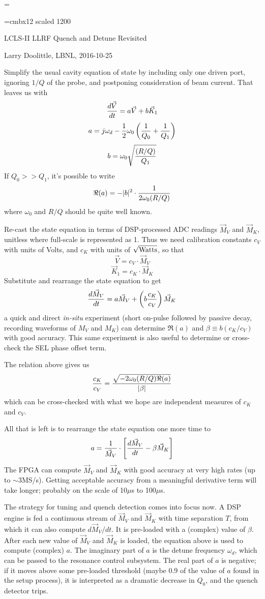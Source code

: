 
\magnification=

\parindent=0pt
\parskip=6pt
\baselineskip=14.0pt
\font\big=cmbx12 scaled 1200

\centerline{\big LCLS-II LLRF Quench and Detune Revisited}
\smallskip
\centerline{Larry Doolittle, LBNL, 2016-10-25}
\bigskip
Simplify the usual cavity equation of state by including only
one driven port, ignoring $1/Q$ of the probe, and postponing consideration
of beam current.
That leaves us with
$$ {d\vec V\over dt} = a \vec V + b \vec K_1 $$
$$ a = j\omega_d - {1\over 2}\omega_0\left({1\over Q_0}+{1\over Q_1}\right) $$
$$ b = \omega_0\sqrt{(R/Q)\over Q_1} $$
If $Q_0 >> Q_1$, it's possible to write
$$ \Re(a) = -|b|^2 \cdot {1\over 2\omega_0 (R/Q)} $$
where $\omega_0$ and $R/Q$ should be quite well known.

Re-cast the state equation in terms of DSP-processed ADC readings
$\vec M_V$ and $\vec M_K$, unitless where full-scale is represented as 1.
Thus we need calibration constants $c_V$ with units of Volts, and
$c_K$ with units of $\sqrt{\rm Watts}$, so that
$$ \vec V = c_V \cdot \vec M_V $$
$$ \vec K_1 = c_K \cdot \vec M_K $$
Substitute and rearrange the state equation to get
$$ {d\vec M_V\over dt} = a \vec M_V + \left(b{c_K\over c_V}\right) \vec M_K $$
a quick and direct {\it in-situ} experiment (short on-pulse followed by
passive decay, recording waveforms of $M_V$ and $M_K$) can determine
$\Re(a)$ and $\beta \equiv b(c_K/c_V)$ with good accuracy.
This same experiment is
also useful to determine or cross-check the SEL phase offset term.

The relation above gives us
$$ {c_K\over c_V} = {\sqrt{-2\omega_0 (R/Q) \Re(a)}\over |\beta|} $$
which can be cross-checked with what we hope are independent measures
of $c_K$ and $c_V$.

All that is left is to rearrange the state equation one more time to
$$a = {1\over \vec M_V}\cdot \left[{d\vec M_V\over dt} - \beta \vec M_K\right] $$
The FPGA can compute $\vec M_V$ and $\vec M_K$ with good accuracy at
very high rates (up to $\sim$3\thinspace MS/s).  Getting acceptable
accuracy from a meaningful derivative term will take longer;
probably on the scale of 10\thinspace $\mu$s to 100\thinspace $\mu$s.

The strategy for tuning and quench detection comes into focus now.
A DSP engine is fed a continuous stream of $\vec M_V$ and $\vec M_K$
with time separation $T$, from which it can also compute $d\vec M_V/dt$.
It is pre-loaded with a (complex) value of $\beta $.
After each new value of $\vec M_V$ and $\vec M_K$ is loaded, the
equation above is used to compute (complex) $a$.  The imaginary part
of $a$ is the detune frequency $\omega_d$, which can be passed to
the resonance control subsystem.  The real part of $a$ is negative;
if it moves above some pre-loaded threshold (maybe 0.9 of the value of
$a$ found in the setup process), it is interpreted as a dramatic decrease
in $Q_0$, and the quench detector trips.

